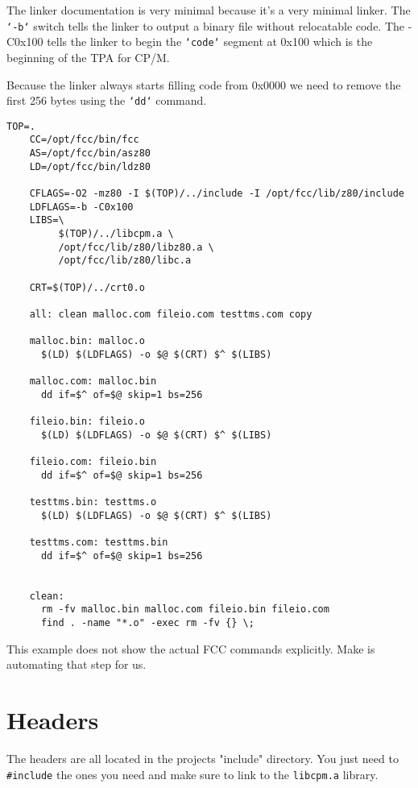 \documentclass[10pt,a4paper,hidelinks]{article}
\begin{document}
The linker documentation is very minimal because it's a very minimal linker.
The \texttt{`-b`} switch tells the linker to output a binary file without
relocatable code.  The -C0x100 tells the linker to begin the \texttt{`code`}
segment at 0x100 which is the beginning of the TPA for CP/M.

Because the linker always starts filling code from 0x0000 we need to remove the
first 256 bytes using the \texttt{`dd`} command.
\pagebreak

\begin{center}
  \begin{lstlisting}[caption=Example Makefile]
    TOP=.
    CC=/opt/fcc/bin/fcc
    AS=/opt/fcc/bin/asz80
    LD=/opt/fcc/bin/ldz80

    CFLAGS=-O2 -mz80 -I $(TOP)/../include -I /opt/fcc/lib/z80/include
    LDFLAGS=-b -C0x100
    LIBS=\
         $(TOP)/../libcpm.a \
         /opt/fcc/lib/z80/libz80.a \
         /opt/fcc/lib/z80/libc.a

    CRT=$(TOP)/../crt0.o

    all: clean malloc.com fileio.com testtms.com copy

    malloc.bin: malloc.o
      $(LD) $(LDFLAGS) -o $@ $(CRT) $^ $(LIBS)

    malloc.com: malloc.bin
      dd if=$^ of=$@ skip=1 bs=256

    fileio.bin: fileio.o
      $(LD) $(LDFLAGS) -o $@ $(CRT) $^ $(LIBS)

    fileio.com: fileio.bin
      dd if=$^ of=$@ skip=1 bs=256

    testtms.bin: testtms.o
      $(LD) $(LDFLAGS) -o $@ $(CRT) $^ $(LIBS)

    testtms.com: testtms.bin
      dd if=$^ of=$@ skip=1 bs=256


    clean:
      rm -fv malloc.bin malloc.com fileio.bin fileio.com
      find . -name "*.o" -exec rm -fv {} \;
  \end{lstlisting}
\end{center}
\label{lst:makefile}

This example does not show the actual FCC commands explicitly.  Make is
automating that step for us.
\pagebreak

\section{Headers}

The headers are all located in the projects "include" directory.  You just need
to \texttt{\#include} the ones you need and make sure to link to the
\texttt{libcpm.a} library.
\end{document}
